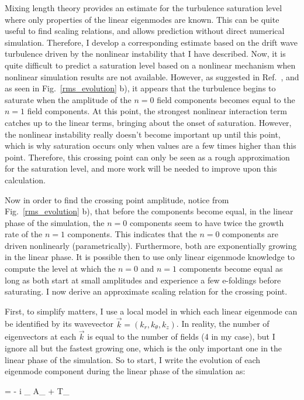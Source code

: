 Mixing length theory provides an estimate for the turbulence saturation level where only properties of the linear eigenmodes are known. This can be quite useful to find scaling relations, and allows
prediction without direct numerical simulation. Therefore, I develop a corresponding estimate based on the drift wave turbulence driven by the nonlinear instability that I have described.
Now, it is quite difficult to predict a saturation level based on a nonlinear mechanism when nonlinear simulation results are not available. However, as suggested in Ref.~\cite{cheng1979},
and as seen in Fig.~\ref{rms_evolution} b), it appears that the turbulence begins to saturate when the amplitude of the $n=0$ field components becomes equal to the $n=1$ field components.
At this point, the strongest nonlinear interaction term catches up to the linear terms, bringing about the onset of saturation. However, the nonlinear instability really doesn't become important
up until this point, which is why saturation occurs only when values are a few times higher than this point. Therefore, this crossing point can only be seen as a rough approximation for the
saturation level, and more work will be needed to improve upon this calculation.

Now in order to find the crossing point amplitude, notice from Fig.~\ref{rms_evolution} b), that before the components become equal, in the linear phase of the simulation,
the $n=0$ components seem to have twice the growth rate of the $n=1$ components. This indicates that the
$n=0$ components are driven nonlinearly (parametrically). Furthermore, both are exponentially growing in the linear phase. It is possible then to use only linear eigenmode knowledge
to compute the level at which the $n=0$ and $n=1$ components become equal as long as both start at small amplitudes and experience a few e-foldings before saturating. I now derive
an approximate scaling relation for the crossing point.

First, to simplify matters, I use a local model in which each linear eigenmode can be identified by its wavevector $\vec{k} = (k_r, k_\theta, k_z)$. In reality, the number of eigenvectors at each
$\vec{k}$ is equal to the number of fields (4 in my case), but I ignore all but the fastest growing one, which is the only important one in the linear phase of the simulation.
So to start, I write the evolution of each eigenmode component during the linear phase of the simulation as:

\beq
\label{eigenmode_evolution}
 = - i \omega_{} A_{} + T_{}
\eeq

